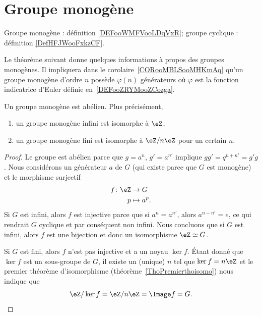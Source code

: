 \section{Groupe monogène}
\label{SECooXIHPooWVSjhT}

Groupe monogène : définition \ref{DEFooWMFVooLDqVxR}; groupe cyclique : définition \ref{DefHFJWooFxkzCF}.

Le théorème suivant donne quelques informations à propos des groupes monogènes. Il impliquera dans le corolaire~\ref{CORooMBLSooMHKmAq} qu'un groupe monogène d'ordre \( n\) possède \( \varphi(n)\) générateurs où \( \varphi\) est la fonction indicatrice d'Euler définie en~\ref{DEFooZRYMooZCozga}.

\begin{theorem}     \label{THOooDOMZooOEYHAe}
	Un groupe monogène est abélien. Plus précisément,
	\begin{enumerate}
		\item
		      un groupe monogène infini est isomorphe à \( \eZ\),
		\item
		      un groupe monogène fini est isomorphe à \( \eZ/n\eZ\) pour un certain \( n\).
	\end{enumerate}
\end{theorem}

\begin{proof}
	Le groupe est abélien parce que \( g=a^n\), \( g'=a^{n'}\) implique \( gg'=q^{n+n'}=g'g\). Nous considérons un générateur \( a\) de \( G\) (qui existe parce que \( G\) est monogène) et le morphisme surjectif
	\begin{equation}
		\begin{aligned}
			f\colon \eZ & \to G        \\
			p           & \mapsto a^p.
		\end{aligned}
	\end{equation}
	Si \( G\) est infini, alors \( f\) est injective parce que si \( a^n=a^{n'}\), alors \( a^{n-n'}=e\), ce qui rendrait \( G\) cyclique et par conséquent non infini. Nous concluons que si \( G\) est infini, alors \( f\) est une bijection et donc un isomorphisme \( \eZ\simeq G\).

	Si \( G\) est fini, alors \( f\) n'est pas injective et a un noyau \( \ker f\). Étant donné que \( \ker f\) est un sous-groupe de \( G\), il existe un (unique) \( n\) tel que \( \ker f=n\eZ\) et le premier théorème d'isomorphisme (théorème~\ref{ThoPremierthoisomo}) nous indique que
	\begin{equation}
		\eZ/\ker f=\eZ/n\eZ=\Image f=G.
	\end{equation}

\end{proof}


